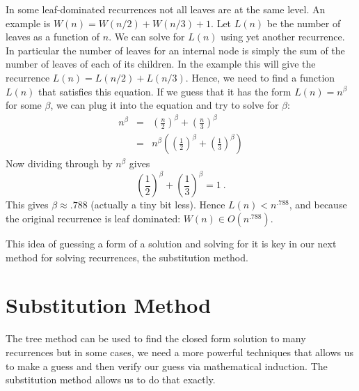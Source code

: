 \begin{cluster}
\label{grp:grm:analysis::recurrences::advanced}

\begin{gram}[Advanced]
\label{grm:analysis::recurrences::advanced}
  In some leaf-dominated recurrences 
 not all leaves are at the same level.    An example is
  $W(n) = W(n/2) + W(n/3) + 1$.
  Let $L(n)$ be the number of leaves as a function of $n$.  We can
  solve for $L(n)$ using yet another recurrence.  In particular the
  number of leaves for an internal node is simply the sum of the
  number of leaves of each of its children.  In the example this will
  give the recurrence $L(n) = L(n/2) + L(n/3)$.  Hence, we need to
  find a function $L(n)$ that satisfies this equation.  If we guess
  that it has the form $L(n) = n^{\beta}$ for some $\beta$, we can
  plug it into the equation and try to solve for $\beta$:
\[
\begin{array}{lcl}
n^{\beta} & =  &\left(\frac{n}{2}\right)^{\beta} +
                         \left(\frac{n}{3}\right)^{\beta}\\
             & =  &n^{\beta}\left(\left(\frac{1}{2}\right)^{\beta} +
                    \left(\frac{1}{3}\right)^{\beta}\right)
\end{array}
\]
Now dividing through by $n^{\beta}$ gives 
\[ \left(\frac{1}{2}\right)^{\beta} + \left(\frac{1}{3}\right)^{\beta}
= 1~.\]
This gives $\beta \approx .788$ (actually a tiny bit less).   Hence $L(n) < n^{.788}$, and
because the original recurrence is leaf dominated:
$W(n) \in O(n^{.788})$.

This idea of guessing a form of a solution and solving for it is key
in our next method for solving recurrences, the substitution method.

\end{gram}
\end{cluster}


\section{Substitution Method}
\label{sec:analysis::recurrences::substitution-method}

\begin{cluster}
\label{grp:grm:analysis::recurrences::method}

\begin{gram}
\label{grm:analysis::recurrences::method}
The tree method can be used to find the closed form solution to many
recurrences but in some cases, we need a more powerful techniques that
allows us to make a guess and then verify our guess via mathematical induction.
The substitution method allows us to do that exactly.

\end{gram}
\end{cluster}

